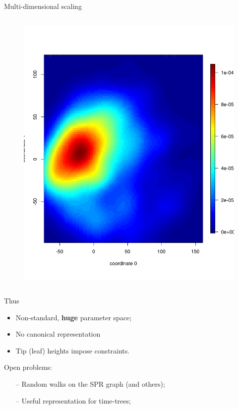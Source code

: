 \documentclass[newPxFont,numfooter,sectionpages]{beamer}
\begin{document}
\begin{frame}{Multi-dimensional scaling}
\begin{column}{0.5\textwidth}
\begin{center}
\begin{figure}
	\includegraphics[width=\textwidth]{figures/BHV_posterior_denv4.pdf}
\end{figure}
 \end{center}

\end{column}
\end{frame}

\begin{frame}{Thus}
\begin{itemize}
 \item Non-standard, \textbf{huge} parameter space;
 \item No canonical representation
 \item Tip (leaf) heights impose constraints.
\end{itemize}
Open problems:
\begin{itemize}
 \item[--] Random walks on the SPR graph (and others);
 \item[--] Useful representation for time-trees;
\end{itemize}
\end{frame}
\end{document}
